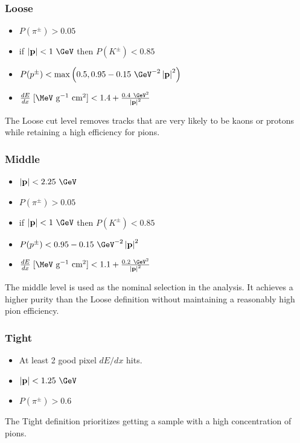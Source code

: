 \subsubsection{Loose}
\begin{itemize}
  \item
    $P(\pi^{\pm}) > 0.05$
  \item
    if $\left|\mathbf{p}\right| < 1~\GeV$ then $P(K^{\pm}) < 0.85$
  \item
    $P(p^{\pm}) < \max\left(0.5, 0.95 - 0.15~\GeV^{-2}\left|\mathbf{p}\right|^{2} \right)$
  \item
    $\frac{dE}{dx} \; [\MeV \textrm{ g}^{-1} \textrm{ cm}^{2}] < 1.4 + \frac{0.4~\GeV^2}{\left|\mathbf{p}\right|^{2}}$
\end{itemize}
The Loose cut level removes tracks that are very likely to be kaons or protons while retaining a high efficiency for pions.

\subsubsection{Middle}
\begin{itemize}
\item %
  $\left|\mathbf{p}\right| < 2.25~\GeV$
\item
  $P(\pi^{\pm}) > 0.05$
\item
  if $\left|\mathbf{p}\right| < 1~\GeV$ then $P(K^{\pm}) < 0.85$
\item
  $P(p^{\pm}) < 0.95 - 0.15~\GeV^{-2}\left|\mathbf{p}\right|^{2}$
\item
  $\frac{dE}{dx} \; [\MeV \textrm{ g}^{-1} \textrm{ cm}^{2}]< 1.1 + \frac{0.2~\GeV^2}{\left|\mathbf{p}\right|^{2}}$
\end{itemize}
The middle level is used as the nominal selection in the analysis. It achieves a higher purity than the Loose definition without maintaining a reasonably high pion efficiency.

\subsubsection{Tight}
\begin{itemize}
\item
  At least 2 good pixel $dE/dx$ hits.
\item
  $\left|\mathbf{p}\right| < 1.25~\GeV$
\item
  $P(\pi^{\pm}) > 0.6$
\end{itemize}
The Tight definition prioritizes getting a sample with a high concentration of pions.

